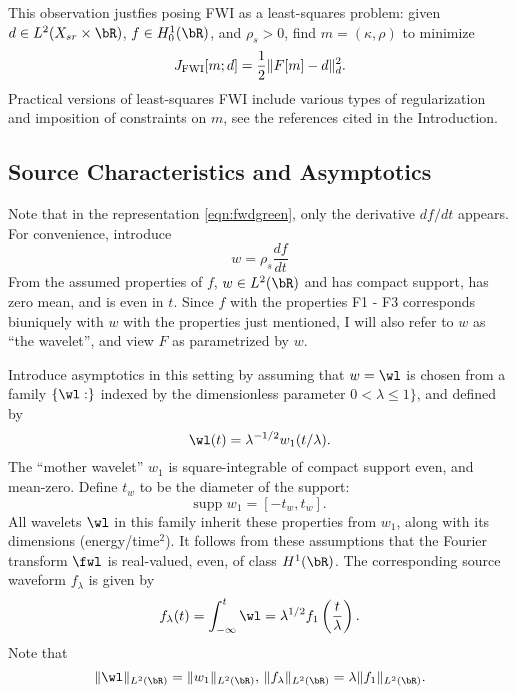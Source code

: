 This observation justfies posing FWI as a least-squares problem: given $d \in
L^2(X_{sr}\times \bR)$, $f \in H^1_0(\bR)$, and $\rho_s>0$, find $m = (\kappa,\rho)$ to minimize
\begin{equation}
  \label{eqn:fwi}
  J_{\rm FWI}[m;d]= \frac{1}{2}\|F[m]-d\|_d^2.
\end{equation}
Practical versions of least-squares FWI include various types of regularization and
imposition of constraints on $m$, see the references cited in the
Introduction.

\subsection{Source Characteristics and Asymptotics}

Note that in the representation \ref{eqn:fwdgreen}, only the
derivative $df/dt$ appears. For convenience, introduce
\begin{equation}
  \label{eqn:wavelet}
  w = \rho_s \frac{df}{dt}
\end{equation}
From the assumed
properties of $f$, $w \in L^2(\bR)$ and has compact support, has zero
mean, and is
even in $t$. Since $f$ with the properties F1 - F3 corresponds
biuniquely with $w$ with the properties just mentioned, I will also
refer to $w$ as ``the wavelet'', and view $F$ as parametrized by $w$.

Introduce asymptotics in this setting by assuming that $w = \wl$ is chosen
from a family $\{\wl:\}$ indexed by the dimensionless parameter
$0 <\lambda \le 1\}$, and defined by
\begin{equation}
  \label{eqn:wfam}
  \wl(t) = \lambda^{-1/2}w_1(t/\lambda).
\end{equation}
The  ``mother wavelet'' $w_1$ is square-integrable of compact support
even, and mean-zero. Define $t_w$ to be the diameter of the support:
\begin{equation}
  \label{eqn:wdiam}
  \mbox{supp }w_1 = [-t_w,t_w].
\end{equation}
All wavelets $\wl$ in this family
inherit these properties from $w_1$, along with its dimensions
(energy/time$^2$). It follows from these assumptions that the Fourier transform $\fwl$ is
real-valued, even, of class $H^1(\bR)$. The corresponding source waveform $f_{\lambda}$ is
given by
\begin{equation}
  \label{eqn:flambda}
  f_{\lambda}(t) = \int_{-\infty}^t\wl =
  \lambda^{1/2}f_1\left(\frac{t}{\lambda}\right).
\end{equation}
Note that
\begin{equation}
  \label{eqn:lambdanorms}
  \|\wl\|_{L^2(\bR)} = \|w_1\|_{L^2(\bR)},\,\|f_{\lambda}\|_{L^2(\bR)}
  = \lambda \|f_1\|_{L^2(\bR)}.
\end{equation}


